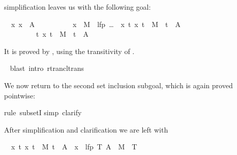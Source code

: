 \begin{isabellebody}
\begin{isamarkuptxt}
simplification leaves us with the following goal:
\begin{isabelle}
\ {}{\isachardot}\ {\isasymAnd}x{\isachardot}\ x\ {\isasymin}\ A\ {\isasymor}\isanewline
\ \ \ \ \ \ \ \ \ x\ {\isasymin}\ M{\isasyminverse}\ {\isacharbackquote}{\isacharbackquote}\ {\isacharparenleft}lfp\ {\isacharparenleft}\dots{\isacharparenright}\ {\isasyminter}\ {\isacharbraceleft}x{\isachardot}\ {\isasymexists}t{\isachardot}\ {\isacharparenleft}x{\isacharcomma}\ t{\isacharparenright}\ {\isasymin}\ M\isactrlsup {\isacharasterisk}\ {\isasymand}\ t\ {\isasymin}\ A{\isacharbraceright}{\isacharparenright}\isanewline
\ \ \ \ \ \ \ \ {\isasymLongrightarrow}\ {\isasymexists}t{\isachardot}\ {\isacharparenleft}x{\isacharcomma}\ t{\isacharparenright}\ {\isasymin}\ M\isactrlsup {\isacharasterisk}\ {\isasymand}\ t\ {\isasymin}\ A
\end{isabelle}
It is proved by , using the transitivity of 
.%
\end{isamarkuptxt}%
\isamarkuptrue%
\ \isamarkupfalse%
{}blast\ intro{}\ rtrancl{}trans{}%
\begin{isamarkuptxt}%
We now return to the second set inclusion subgoal, which is again proved
pointwise:%
\end{isamarkuptxt}%
\isamarkuptrue%
\isamarkupfalse%
{}rule\ subsetI{}\isanewline
{}\isamarkupfalse%
{}simp{}\ clarify{}%
\begin{isamarkuptxt}%
\noindent
After simplification and clarification we are left with
\begin{isabelle}%
\ {}{}\ {}x\ t{}\ {}{}x{}\ t{}\ {}\ M\ t\ {}\ A{}\ {}\ x\ {}\ lfp\ {}{}T{}\ A\ {}\ M{}\ {}{}\ T{}%

\end{isabelle}
\end{isamarkuptxt}
\end{isabellebody}
